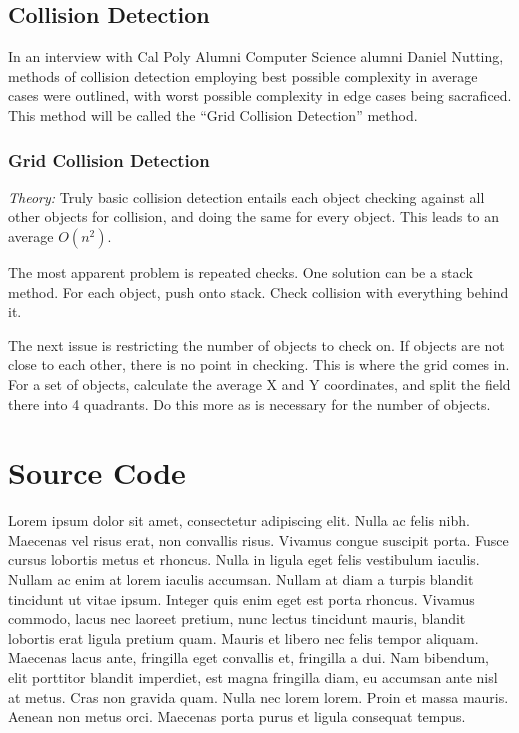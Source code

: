 \documentclass[12pt]{article}
\begin{document}
  \subsection{Collision Detection}
    In an interview with Cal Poly Alumni Computer Science alumni Daniel Nutting, methods of collision detection employing best possible complexity in average cases were outlined, with worst possible complexity in edge cases being sacraficed. This method will be called the ``Grid Collision Detection'' method.

    \subsubsection{Grid Collision Detection}
      \emph{Theory: } Truly basic collision detection entails each object checking against all other objects for collision, and doing the same for every object. This leads to an average $O(n^2)$.

      The most apparent problem is repeated checks. One solution can be a stack method. For each object, push onto stack. Check collision with everything behind it.

      The next issue is restricting the number of objects to check on. If objects are not close to each other, there is no point in checking. This is where the grid comes in. For a set of objects, calculate the average X and Y coordinates, and split the field there into 4 quadrants. Do this more as is necessary for the number of objects.

  \section{Source Code}
    Lorem ipsum dolor sit amet, consectetur adipiscing elit. Nulla ac felis nibh. Maecenas vel risus erat, non convallis risus. Vivamus congue suscipit porta. Fusce cursus lobortis metus et rhoncus. Nulla in ligula eget felis vestibulum iaculis. Nullam ac enim at lorem iaculis accumsan. Nullam at diam a turpis blandit tincidunt ut vitae ipsum. Integer quis enim eget est porta rhoncus. Vivamus commodo, lacus nec laoreet pretium, nunc lectus tincidunt mauris, blandit lobortis erat ligula pretium quam. Mauris et libero nec felis tempor aliquam. Maecenas lacus ante, fringilla eget convallis et, fringilla a dui. Nam bibendum, elit porttitor blandit imperdiet, est magna fringilla diam, eu accumsan ante nisl at metus. Cras non gravida quam. Nulla nec lorem lorem. Proin et massa mauris. Aenean non metus orci. Maecenas porta purus et ligula consequat tempus.
\end{document}
